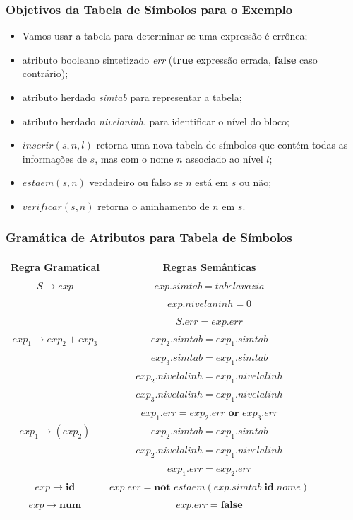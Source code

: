 \documentclass[table]{beamer}
\begin{document}
\begin{frame}
   \frametitle{Objetivos da Tabela de Símbolos para o Exemplo}
   \begin{itemize}
      \item Vamos usar a tabela para determinar se uma expressão é errônea;
      \item atributo booleano sintetizado \textit{err} (\textbf{true} expressão errada, \textbf{false} caso contrário);
      \item atributo herdado \textit{simtab} para representar a tabela;
      \item atributo herdado \textit{nivelaninh}, para identificar o nível do bloco;
      \item $inserir(s, n, l)$ retorna uma nova tabela de símbolos que contém todas as informações de $s$, mas com o nome $n$ associado ao nível $l$;
      \item $estaem(s,n)$ verdadeiro ou falso se $n$ está em $s$ ou não;
      \item $verificar(s,n)$ retorna o aninhamento de $n$ em $s$.
   \end{itemize}
\end{frame}

\begin{frame}
   \frametitle{Gramática de Atributos para Tabela de Símbolos}
   \begin{table}
      \begin{tabular}{cc}
      Regra Gramatical & Regras Semânticas \\
      \hline 
      $S\to exp$ & $exp.simtab = tabelavazia$ \\
                 & $exp.nivelaninh = 0$ \\
                 & $S.err = exp.err$ \\
      \hline
      $exp_{1}\to exp_{2} + exp_{3}$ & $exp_{2}.simtab=exp_{1}.simtab$ \\
                                     & $exp_{3}.simtab=exp_{1}.simtab$ \\
                                     & $exp_{2}.nivelalinh=exp_{1}.nivelalinh$ \\
                                     & $exp_{3}.nivelalinh=exp_{1}.nivelalinh$ \\
                                     & $exp_{1}.err=exp_{2}.err \textbf{ or }exp_{3}.err$ \\
      \hline
      $exp_{1}\to(exp_{2})$ & $exp_{2}.simtab = exp_{1}.simtab$ \\
                            & $exp_{2}.nivelalinh = exp_{1}.nivelalinh$ \\
                            & $exp_{1}.err = exp_{2}.err$ \\
      \hline
      $exp\to\textbf{id}$ & $exp.err = \textbf{not } estaem(exp.simtab.\textbf{id}.nome)$ \\
      \hline
      $exp\to\textbf{num}$ & $exp.err = \textbf{false}$ \\
      \end{tabular}
   \end{table}
\end{frame}
\end{document}
